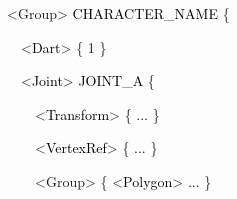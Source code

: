 \documentclass[a4paper]{article}
\newcommand\textstyleOOoComputerKeyWord[1]{\textrm{\textcolor[rgb]{0.0,0.0,0.5019608}{#1}}}
\newcommand\textstyleOOoAssemblerSpecialChar[1]{\textrm{\textcolor[rgb]{0.0,0.5019608,0.0}{#1}}}
\newcommand\textstyleOOoAssemblerIdent[1]{\textrm{\textcolor{black}{#1}}}
\newcommand\textstyleOOoAssemblerDirective[1]{\textrm{\textcolor[rgb]{0.0,0.5019608,1.0}{#1}}}
\newcommand\textstyleOOoAssemblerLiteral[1]{\textrm{\textcolor[rgb]{0.49803922,0.0,0.49803922}{#1}}}
\begin{document}
\bigskip

{\color{black}
\textstyleOOoAssemblerSpecialChar{{\textless}}\textstyleOOoAssemblerDirective{Group}\textstyleOOoAssemblerSpecialChar{{\textgreater}}\textstyleOOoComputerKeyWord{\textcolor{black}{
}}\textstyleOOoAssemblerIdent{CHARACTER\_NAME}\textstyleOOoComputerKeyWord{\textcolor{black}{
}}\textstyleOOoAssemblerSpecialChar{\{}}

{\color{black}
\textstyleOOoComputerKeyWord{\textcolor{black}{\ \ }}\textstyleOOoAssemblerSpecialChar{{\textless}}\textstyleOOoAssemblerIdent{Dart}\textstyleOOoAssemblerSpecialChar{{\textgreater}}\textstyleOOoComputerKeyWord{\textcolor{black}{
}}\textstyleOOoAssemblerSpecialChar{\{}\textstyleOOoComputerKeyWord{\textcolor{black}{
}}\textstyleOOoAssemblerLiteral{1}\textstyleOOoComputerKeyWord{\textcolor{black}{
}}\textstyleOOoAssemblerSpecialChar{\}}}

{\color{black}
\textstyleOOoComputerKeyWord{\textcolor{black}{\ \ }}\textstyleOOoAssemblerSpecialChar{{\textless}}\textstyleOOoAssemblerIdent{Joint}\textstyleOOoAssemblerSpecialChar{{\textgreater}}\textstyleOOoComputerKeyWord{\textcolor{black}{
}}\textstyleOOoAssemblerIdent{JOINT\_A}\textstyleOOoComputerKeyWord{\textcolor{black}{
}}\textstyleOOoAssemblerSpecialChar{\{}}

{\color{black}
\textstyleOOoComputerKeyWord{\textcolor{black}{\ \ \ \ }}\textstyleOOoAssemblerSpecialChar{{\textless}}\textstyleOOoAssemblerIdent{Transform}\textstyleOOoAssemblerSpecialChar{{\textgreater}}\textstyleOOoComputerKeyWord{\textcolor{black}{
}}\textstyleOOoAssemblerSpecialChar{\{}\textstyleOOoComputerKeyWord{\textcolor{black}{
}}\textstyleOOoAssemblerIdent{...}\textstyleOOoComputerKeyWord{\textcolor{black}{
}}\textstyleOOoAssemblerSpecialChar{\}}}

{\color{black}
\textstyleOOoComputerKeyWord{\textcolor{black}{\ \ \ \ }}\textstyleOOoAssemblerSpecialChar{{\textless}}\textstyleOOoAssemblerIdent{VertexRef}\textstyleOOoAssemblerSpecialChar{{\textgreater}}\textstyleOOoComputerKeyWord{\textcolor{black}{
}}\textstyleOOoAssemblerSpecialChar{\{}\textstyleOOoComputerKeyWord{\textcolor{black}{
}}\textstyleOOoAssemblerIdent{...}\textstyleOOoComputerKeyWord{\textcolor{black}{
}}\textstyleOOoAssemblerSpecialChar{\}}}

{\color{black}
\textstyleOOoComputerKeyWord{\textcolor{black}{\ \ \ \ }}\textstyleOOoAssemblerSpecialChar{{\textless}}\textstyleOOoAssemblerDirective{Group}\textstyleOOoAssemblerSpecialChar{{\textgreater}}\textstyleOOoComputerKeyWord{\textcolor{black}{
}}\textstyleOOoAssemblerSpecialChar{\{}\textstyleOOoComputerKeyWord{\textcolor{black}{
}}\textstyleOOoAssemblerSpecialChar{{\textless}}\textstyleOOoAssemblerIdent{Polygon}\textstyleOOoAssemblerSpecialChar{{\textgreater}}\textstyleOOoComputerKeyWord{\textcolor{black}{
}}\textstyleOOoAssemblerIdent{...}\textstyleOOoComputerKeyWord{\textcolor{black}{
}}\textstyleOOoAssemblerSpecialChar{\}}}
\end{document}
